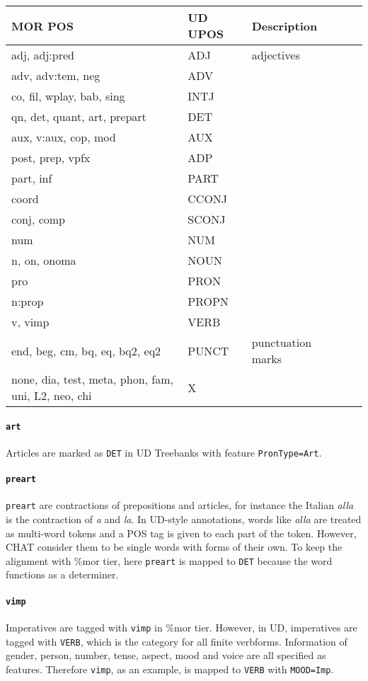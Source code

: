 \begin{table}[h!]
\begin{tabular}{@{}lllll@{}}
\toprule
\textbf{MOR POS} & \textbf{UD UPOS} & \textbf{Description}\\ \midrule
adj, adj:pred & ADJ & adjectives\\
adv, adv:tem, neg & ADV & \\
co, fil, wplay, bab, sing & INTJ & \\
qn, det, quant, art, prepart & DET & \\
aux, v:aux, cop, mod & AUX & \\
post, prep, vpfx & ADP & \\
part, inf & PART & \\
coord & CCONJ & \\
conj, comp & SCONJ & \\
num & NUM & \\
n, on, onoma & NOUN & \\
pro & PRON & \\
n:prop & PROPN & \\
v, vimp & VERB & \\
end, beg, cm, bq, eq, bq2, eq2 & PUNCT & punctuation marks\\
none, dia, test, meta, phon, fam, uni, L2, neo, chi & X & \\\bottomrule
\end{tabular}
\end{table}

\paragraph{\texttt{art}}
Articles are marked as \texttt{DET} in UD Treebanks with feature \texttt{PronType=Art}.\\
\paragraph{\texttt{preart}}
\texttt{preart} are contractions of prepositions and articles, for instance the Italian \emph{alla} is the contraction of \emph{a} and \emph{la}. In UD-style annotations, words like \emph{alla} are treated as multi-word tokens and a POS tag is given to each part of the token. However, CHAT consider them to be single words with forms of their own. To keep the alignment with \%mor tier, here \texttt{preart} is mapped to \texttt{DET} because the word functions as a determiner.\\

\paragraph{\texttt{vimp}}
Imperatives are tagged with \texttt{vimp} in \%mor tier. However, in UD, imperatives are tagged with \texttt{VERB}, which is the category for all finite verbforms. Information of gender, person, number, tense, aspect, mood and voice are all specified as features. Therefore \texttt{vimp}, as an example, is mapped to \texttt{VERB} with \texttt{MOOD=Imp}.\\

